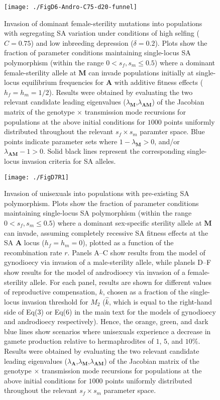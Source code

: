 \documentclass{article}
\begin{document}
\begin{figure}[ht!]
\centering
\texttt{[image: ./FigD6-Andro-C75-d20-funnel]}
\caption{Invasion of dominant female-sterility mutations into populations with segregating SA variation under conditions of high selfing ($C = 0.75$) and low inbreeding depression ($\delta = 0.2$). Plots show the fraction of parameter conditions maintaining single-locus SA polymorphism (within the range $0 < s_f,s_m \leq 0.5$) where a dominant female-sterility allele at $\mathbf{M}$ can invade populations initially at single-locus equilibrium frequencies for $\mathbf{A}$ with additive fitness effects ($h_f=h_m=1/2$). Results were obtained by evaluating the two relevant candidate leading eigenvalues ($\lambda_{\mathbf{M}}$,$\lambda_{\mathbf{AM}}$) of the Jacobian matrix of the genotype $\times$ transmission mode recursions for populations at the above initial conditions for $1000$ points uniformly distributed throughout the relevant $s_f \times s_m$ paramter space. Blue points indicate parameter sets where $1 - \lambda_{\mathbf{M}} > 0$, and/or $\lambda_{\mathbf{AM}} - 1 > 0$. Solid black lines represent the corresponding single-locus invasion criteria for SA alleles.}
\label{fig:AndC75d20Funnel}
\end{figure}
\newpage{}



\begin{figure}[htbp]
\centering
\texttt{[image: ./FigD7R1]}
\caption{Invasion of unisexuals into populations with pre-existing SA polymorphism. Plots show the fraction of parameter conditions maintaining single-locus SA polymorphism (within the range $0 < s_f,s_m \leq 0.5$) where a dominant sex-specific sterility allele at $\mathbf{M}$ can invade, assuming completely recessive SA fitness effects at the SA $\mathbf{A}$ locus ($h_f=h_m=0$), plotted as a function of the recombination rate $r$. Panels A--C show results from the model of gynodioecy via invasion of a male-sterility allele, while planels D--F show results for the model of androdioecy via invasion of a female-sterility allele. For each panel, results are shown for different values of reproductive compensation, $k$, chosen as a fraction of the single-locus invasion threshold for $M_2$ ($\hat{k}$, which is equal to the right-hand side of Eq(3) or Eq(6) in the main text for the models of gynodioecy and androdioecy respectively). Hence, the orange, green, and dark blue lines show scenarios where unisexuals experience a decrease in gamete production relative to hermaphrodites of $1$, $5$, and $10\%$. Results were obtained by evaluating the two relevant candidate leading eigenvalues ($\lambda_{\mathbf{A}}$,$\lambda_{\mathbf{M}}$,$\lambda_{\mathbf{AM}}$) of the Jacobian matrix of the genotype $\times$ transmission mode recursions for populations at the above initial conditions for $1000$ points uniformly distributed throughout the relevant $s_f \times s_m$ parameter space.}
\label{fig:PrInvDomRev}
\end{figure}
\end{document}
